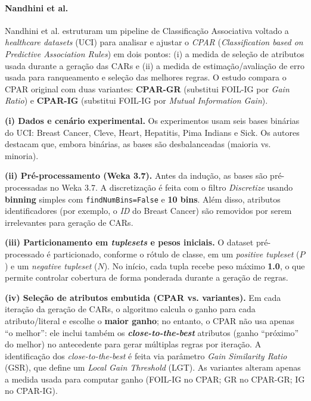 \paragraph*{Nandhini et al.} \cite{nandhini2020performance}

Nandhini et al. \cite{nandhini2020performance} estruturam um pipeline de Classificação Associativa voltado a \textit{healthcare datasets} (UCI) para analisar e ajustar o \textit{CPAR} (\textit{Classification based on Predictive Association Rules}) em dois pontos: (i) a medida de seleção de atributos usada durante a geração das CARs e (ii) a medida de estimação/avaliação de erro usada para ranqueamento e seleção das melhores regras. O estudo compara o CPAR original com duas variantes: \textbf{CPAR-GR} (substitui FOIL-IG por \textit{Gain Ratio}) e \textbf{CPAR-IG} (substitui FOIL-IG por \textit{Mutual Information Gain}).

\textbf{(i) Dados e cenário experimental.}
Os experimentos usam seis bases binárias do UCI: Breast Cancer, Cleve, Heart, Hepatitis, Pima Indians e Sick. Os autores destacam que, embora binárias, as bases são desbalanceadas (maioria vs. minoria). 

\textbf{(ii) Pré-processamento (Weka 3.7).}
Antes da indução, as bases são pré-processadas no Weka 3.7. A discretização é feita com o filtro \textit{Discretize} usando \textbf{binning} simples com \texttt{findNumBins=False} e \textbf{10 bins}. Além disso, atributos identificadores (por exemplo, o \textit{ID} do Breast Cancer) são removidos por serem irrelevantes para geração de CARs. 

\textbf{(iii) Particionamento em \textit{tuplesets} e pesos iniciais.}
O dataset pré-processado é particionado, conforme o rótulo de classe, em um \textit{positive tupleset} ($P$) e um \textit{negative tupleset} ($N$). No início, cada tupla recebe peso máximo \textbf{1.0}, o que permite controlar cobertura de forma ponderada durante a geração de regras. 

\textbf{(iv) Seleção de atributos embutida (CPAR vs. variantes).}
Em cada iteração da geração de CARs, o algoritmo calcula o ganho para cada atributo/literal e escolhe o \textbf{maior ganho}; no entanto, o CPAR não usa apenas “o melhor”: ele inclui também os \textbf{\textit{close-to-the-best}} atributos (ganho “próximo” do melhor) no antecedente para gerar múltiplas regras por iteração. 
A identificação dos \textit{close-to-the-best} é feita via parâmetro \textit{Gain Similarity Ratio} (GSR), que define um \textit{Local Gain Threshold} (LGT). 
As variantes alteram apenas a medida usada para computar ganho (FOIL-IG no CPAR; GR no CPAR-GR; IG no CPAR-IG). 


